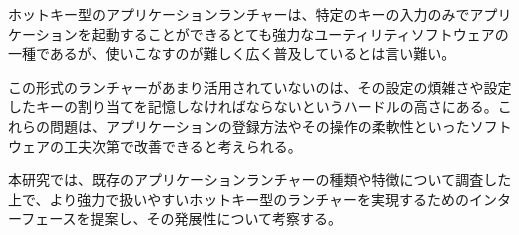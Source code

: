 \begin{jabstract}

ホットキー型のアプリケーションランチャーは、特定のキーの入力のみでアプリケーションを起動することができるとても強力なユーティリティソフトウェアの一種であるが、使いこなすのが難しく広く普及しているとは言い難い。

この形式のランチャーがあまり活用されていないのは、その設定の煩雑さや設定したキーの割り当てを記憶しなければならないというハードルの高さにある。これらの問題は、アプリケーションの登録方法やその操作の柔軟性といったソフトウェアの工夫次第で改善できると考えられる。

本研究では、既存のアプリケーションランチャーの種類や特徴について調査した上で、より強力で扱いやすいホットキー型のランチャーを実現するためのインターフェースを提案し、その発展性について考察する。

\end{jabstract}
